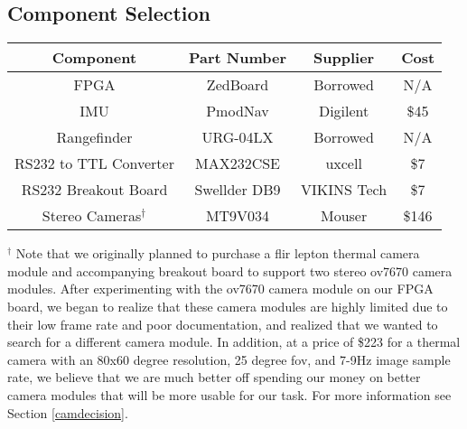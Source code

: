 \subsection{Component Selection} \label{componentSelection}

\begin{center}
\begin{tabular}{ |c|c|c|c| } 
 \hline
 \textbf{Component} & \textbf{Part Number}  & \textbf{Supplier} & \textbf{Cost}  \\ \hline
 FPGA & ZedBoard & Borrowed & N/A  \\ \hline
 IMU & PmodNav & Digilent & \$45  \\ \hline
 Rangefinder & URG-04LX & Borrowed & N/A  \\ \hline
 RS232 to TTL Converter & MAX232CSE & uxcell & \$7  \\ \hline
 RS232 Breakout Board & Swellder DB9 & VIKINS Tech & \$7  \\ \hline
 Stereo Cameras$^\dagger$ & MT9V034 & Mouser & \$146  \\ 
 \hline
\end{tabular}
\end{center}
$^\dagger$ Note that we originally planned to purchase a flir lepton thermal camera module and accompanying breakout board to support two stereo ov7670 camera modules. After experimenting with the ov7670 camera module on our FPGA board, we began to realize that these camera modules are highly limited due to their low frame rate and poor documentation, and realized that we wanted to search for a different camera module. In addition, at a price of \$223 for a thermal camera with an 80x60 degree resolution, 25 degree fov, and 7-9Hz image sample rate, we believe that we are much better off spending our money on better camera modules that will be more usable for our task. For more information see Section  \ref{camdecision}.